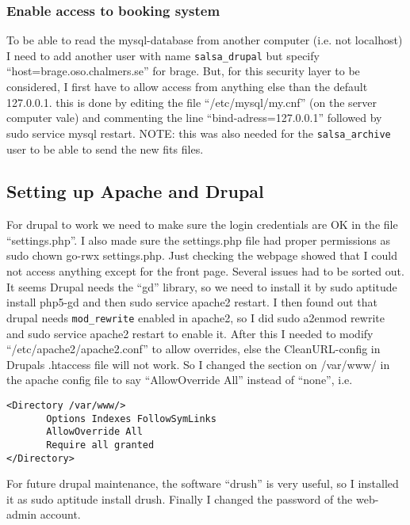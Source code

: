 \subsubsection{Enable access to booking system}
To be able to read the mysql-database from
another computer (i.e. not localhost) I need to add another user with name
\verb!salsa_drupal! but specify “host=brage.oso.chalmers.se” for brage. But, for
this security layer to be considered, I first have to allow access from
anything else than the default 127.0.0.1. this is done by editing the file
“/etc/mysql/my.cnf” (on the server computer vale) and commenting the line
“bind-adress=127.0.0.1” followed by sudo service mysql restart. NOTE: this was
also needed for the \verb!salsa_archive! user to be able to send the new fits files.

\subsection{Setting up Apache and Drupal}
For drupal to work we need to make sure the login credentials are OK in the
file “settings.php”. I also made sure the settings.php file had proper
permissions as sudo chown go-rwx settings.php. Just checking the webpage showed
that I could not access anything except for the front page. Several issues had
to be sorted out. It seems Drupal needs the “gd” library, so we need to install
it by sudo aptitude install php5-gd and then sudo service apache2 restart. I
then found out that drupal needs \verb!mod_rewrite! enabled in apache2, so I did
sudo a2enmod rewrite and sudo service apache2 restart to enable it. After this
I needed to modify “/etc/apache2/apache2.conf” to allow overrides, else the
CleanURL-config in Drupals .htaccess file will not work. So I changed the
section on /var/www/ in the apache config file to say “AllowOverride All”
instead of “none”, i.e.  
\begin{verbatim}
<Directory /var/www/>
       Options Indexes FollowSymLinks
       AllowOverride All
       Require all granted
</Directory>
\end{verbatim}
For future drupal maintenance, the software “drush” is very useful, so I
installed it as sudo aptitude install drush. Finally I changed the password of
the web-admin account.  

